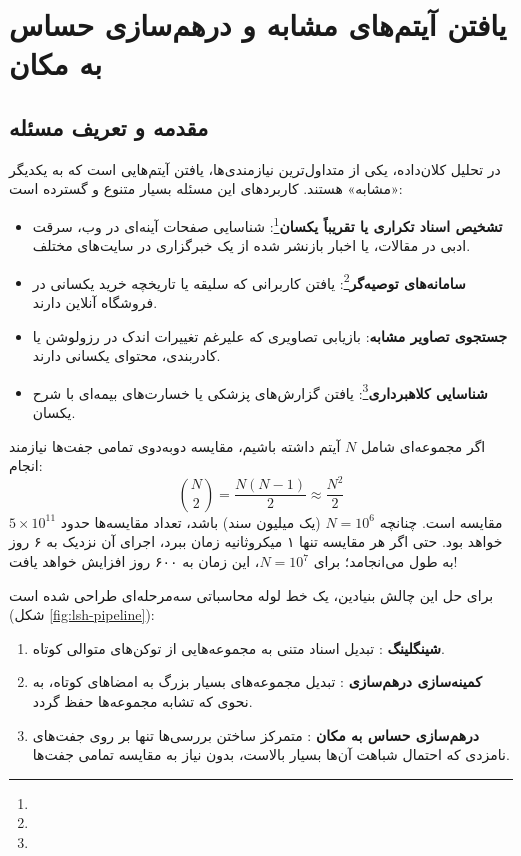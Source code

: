 \chapter{یافتن آیتم‌های مشابه و درهم‌سازی حساس به مکان \texorpdfstring{}{(LSH)}}
\label{ch:similar-items}

\section{مقدمه و تعریف مسئله}
در تحلیل کلان‌داده، یکی از متداول‌ترین نیازمندی‌ها، یافتن آیتم‌هایی است که به یکدیگر «مشابه» هستند. کاربردهای این مسئله بسیار متنوع و گسترده است:
\begin{itemize}
    \item \textbf{تشخیص اسناد تکراری یا تقریباً یکسان}\footnote{}: شناسایی صفحات آینه‌ای در وب، سرقت ادبی در مقالات، یا اخبار بازنشر شده از یک خبرگزاری در سایت‌های مختلف.
    \item \textbf{سامانه‌های توصیه‌گر}\footnote{}: یافتن کاربرانی که سلیقه یا تاریخچه خرید یکسانی در فروشگاه آنلاین دارند.
    \item \textbf{جستجوی تصاویر مشابه}: بازیابی تصاویری که علیرغم تغییرات اندک در رزولوشن یا کادربندی، محتوای یکسانی دارند.
    \item \textbf{شناسایی کلاهبرداری}\footnote{}: یافتن گزارش‌های پزشکی یا خسارت‌های بیمه‌ای با شرح یکسان.
\end{itemize}

اگر مجموعه‌ای شامل $N$ آیتم داشته باشیم، مقایسه دوبه‌دوی تمامی جفت‌ها نیازمند انجام:
\begin{equation}
\binom{N}{2} = \frac{N(N-1)}{2} \approx \frac{N^2}{2}
\end{equation}
مقایسه است. چنانچه $N = 10^6$ (یک میلیون سند) باشد، تعداد مقایسه‌ها حدود $5 \times 10^{11}$ خواهد بود. حتی اگر هر مقایسه تنها ۱ میکروثانیه زمان ببرد، اجرای آن نزدیک به ۶ روز به طول می‌انجامد؛ برای $N = 10^7$، این زمان به ۶۰۰ روز افزایش خواهد یافت!

برای حل این چالش بنیادین، یک خط لوله محاسباتی سه‌مرحله‌ای طراحی شده است (شکل \ref{fig:lsh-pipeline}):
\begin{enumerate}
    \item \textbf{شینگلینگ }: تبدیل اسناد متنی به مجموعه‌هایی از توکن‌های متوالی کوتاه.
    \item \textbf{کمینه‌سازی درهم‌سازی }: تبدیل مجموعه‌های بسیار بزرگ به امضاهای کوتاه، به نحوی که تشابه مجموعه‌ها حفظ گردد.
    \item \textbf{درهم‌سازی حساس به مکان }: متمرکز ساختن بررسی‌ها تنها بر روی جفت‌های نامزدی که احتمال شباهت آن‌ها بسیار بالاست، بدون نیاز به مقایسه تمامی جفت‌ها.
\end{enumerate}

